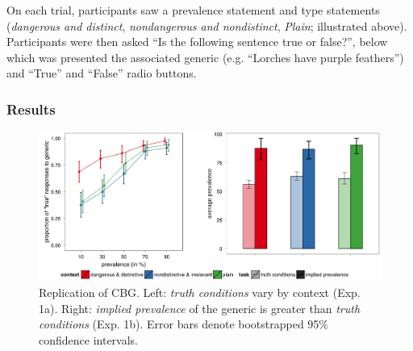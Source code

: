 \documentclass[10pt,letterpaper]{article}
\begin{document}
On each trial, participants saw a prevalence statement and type statements (\emph{dangerous and distinct}, \emph{nondangerous and nondistinct}, \emph{Plain}; illustrated above). 
Participants were then asked ``Is the following sentence true or false?'', below which was presented the associated generic (e.g. ``Lorches have purple feathers'') and ``True'' and ``False'' radio buttons. 

\subsubsection{Results}



\begin{figure}
\centering
    \includegraphics[width=\columnwidth]{Xexp1data}
    \caption{Replication of CBG. Left: \emph{truth conditions} vary by context (Exp. 1a). Right: \emph{implied prevalence} of the generic is greater than \emph{truth conditions} (Exp. 1b). Error bars denote bootstrapped 95\% confidence intervals.}
  \label{fig:exp1}
\end{figure}
\end{document}
